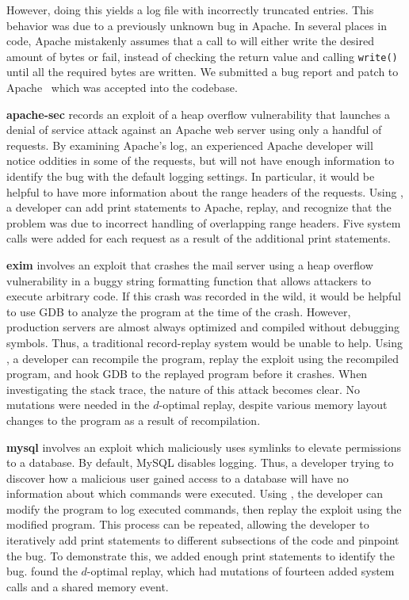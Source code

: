 However, doing
this yields a log file with incorrectly truncated entries. This
behavior was due to a
previously unknown bug in Apache.
In several places in code, Apache mistakenly assumes that a call
to  will either write the desired amount of bytes or
fail, instead of checking the return
value and calling {\tt write()} until all the required bytes are
written. We submitted a bug report and patch to Apache~\cite{apache-bug-53131} which was
accepted into the codebase.

{\bf apache-sec} records an exploit of a heap overflow
vulnerability that launches a denial of service attack against an Apache
web server using only a handful of requests. By examining Apache's log,
an experienced Apache developer will notice oddities in some of the requests,
but will not have enough information to identify the bug with the default
logging settings. In particular, it would be helpful to have more
information about the range headers of the requests. Using {\dora}, a
developer can add print statements to Apache, replay, and recognize that the
problem was due to incorrect handling of overlapping range headers. Five system
calls were added for each request as a result of the additional print
statements.

{\bf exim} involves an exploit that crashes the mail server using a
heap overflow vulnerability in a buggy string formatting function
that allows attackers to execute arbitrary code. If this crash was recorded in
the wild, it would be helpful to use GDB to analyze the program at the time of
the crash. However, production servers are almost always optimized and compiled
without debugging symbols. Thus, a traditional record-replay system would be
unable to help. Using {\dora}, a developer can recompile the
program, replay the exploit
using the recompiled program, and hook GDB to the replayed program
before it crashes. When investigating the stack trace, the nature of
this attack becomes clear. No mutations were needed in the $d$-optimal replay,
despite various memory layout changes to the program as a result of
recompilation.

{\bf mysql} involves an exploit which maliciously uses symlinks
to elevate permissions to a database. By default, MySQL disables
logging. Thus, a developer trying to discover how
a malicious user gained access to a database
will have no information about which commands
were executed. Using {\dora}, the developer can modify the program
to log executed commands, then replay the exploit
using the modified program. This process can be repeated, allowing
the developer to iteratively add print statements to different subsections of the
code and pinpoint the bug. To demonstrate this, we added enough print statements
to identify the bug. {\dora} found the $d$-optimal replay, which had
mutations of fourteen added system calls and a shared memory event.

